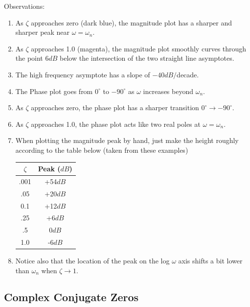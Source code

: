 \begin{ExampleCont}
Observations:

\begin{enumerate}
  \item As $\zeta$ approaches zero (dark blue), the magnitude plot has a sharper and sharper peak near $\omega=\omega_n$.
  \item As $\zeta$ approaches 1.0 (magenta), the magnitude plot smoothly curves through the point 6$dB$ below the intersection of the two straight line asymptotes.
  \item The high frequency asymptote has a slope of $-40dB/$decade.
  \item The Phase plot goes from $0^\circ$ to $-90^\circ$ as $\omega$ increases beyond $\omega_n$.

  \item As $\zeta$ approaches zero, the phase plot has a sharper transition $0^\circ \to -90^\circ$.
  \item As $\zeta$ approaches 1.0,  the phase plot acts like two real poles at $\omega = \omega_n$.
  \item When plotting the magnitude peak by hand, just make the height roughly according to the table below (taken from these examples)

\begin{center}
\begin{tabular}{c|c}
  $\zeta$    & Peak ($dB$)   \\ \hline
  .001   &   +54$dB$    \\
  .05    &   +20$dB$    \\
   0.1   &   +12$dB$    \\
  .25    &   +6$dB$     \\
   .5    &    0$dB$     \\
   1.0   &   -6$dB$     \\
\end{tabular}\end{center}

  \item  Notice also that the location  of the peak on the log $\omega$ axis
  shifts a bit lower than $\omega_n$ when $\zeta \to 1$.

\end{enumerate}

\end{ExampleCont}

\subsection{Complex Conjugate Zeros}


